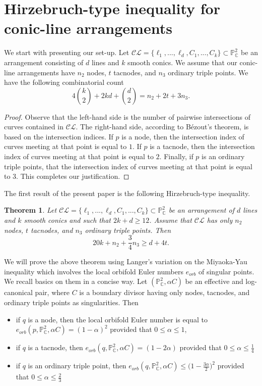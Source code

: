 \documentclass[12pt]{amsart}
\theoremstyle{plain}
\newtheorem{thm}[subsection]{Theorem}
\theoremstyle{definition}
\numberwithin{equation}{section}
\begin{document}
\section{Hirzebruch-type inequality for conic-line arrangements}
We start with presenting our set-up. Let $\mathcal{CL} = \{\ell_{1}, ..., \ell_{d}, C_{1}, ..., C_{k} \} \subset \mathbb{P}^{2}_{\mathbb{C}}$ be an arrangement consisting of $d$ lines and $k$ smooth conics. We assume that our conic-line arrangements have $n_{2}$ nodes, $t$ tacnodes, and $n_{3}$ ordinary triple points. We have the following combinatorial count
\begin{equation}
\label{comb:naiv}
4 \binom{k}{2} + 2kd + \binom{d}{2} = n_{2} + 2t + 3n_{3}.
\end{equation}
\begin{proof}
Observe that the left-hand side is the number of pairwise intersections of curves contained in $\mathcal{CL}$. The right-hand side, according to B\'ezout's theorem, is based on the intersection indices. If $p$ is a node, then the intersection index of curves meeting at that point is equal to $1$. If $p$ is a tacnode, then the intersection index of curves meeting at that point is equal to $2$. Finally, if $p$ is an ordinary triple points, that the intersection index of curves meeting at that point is equal to $3$. This completes our justification.
\end{proof}
The first result of the present paper is the following Hirzebruch-type inequality.
\begin{thm}
\label{hirz}
Let $\mathcal{CL} = \{\ell_{1}, ..., \ell_{d}, C_{1}, ..., C_{k}\} \subset\mathbb{P}^{2}_{\mathbb{C}}$ be an arrangement of $d$ lines and $k$ smooth conics and such that $2k+d \geq 12$. Assume that $\mathcal{CL}$ has only $n_{2}$ nodes, $t$ tacnodes, and $n_{3}$ ordinary triple points. Then
\begin{equation}
    20k +n_{2} + \frac{3}{4}n_{3} \geq d + 4t.
\end{equation}
\end{thm}
We will prove the above theorem using Langer's variation on the Miyaoka-Yau inequality \cite{Langer} which involves the local orbifold Euler numbers $e_{orb}$ of singular points. We recall basics on them in a concise way. Let $(\mathbb{P}^{2}_{\mathbb{C}}, \alpha C)$ be an effective and log-canonical pair, where $C$ is a boundary divisor having only nodes, tacnodes, and ordinary triple points as singularities. Then
\begin{itemize}
    \item if $q$ is a node, then  the local orbifold Euler number is equal to $e_{orb}(p,\mathbb{P}^{2}_{\mathbb{C}}, \alpha C)=(1-\alpha)^2$ provided that $0 \leq \alpha \leq 1$,
    \item if $q$ is a tacnode, then $e_{orb}(q,\mathbb{P}^{2}_{\mathbb{C}}, \alpha C) =(1-2 \alpha)$ provided that $0 \leq \alpha \leq \frac{1}{4}$
    \item if $q$ is an ordinary triple point, then $e_{orb}(q,\mathbb{P}^{2}_{\mathbb{C}}, \alpha C) \leq \bigg(1 - \frac{3\alpha}{2}\bigg)^2$ provided that $0 \leq \alpha \leq \frac{2}{3}$
\end{itemize}
\end{document}
